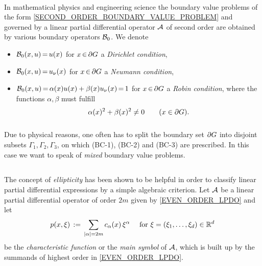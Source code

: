\documentclass[11pt,twoside]{article}
\begin{document}
\paragraph{} %
In mathematical physics and engineering science
the boundary value problems of the form \eqref{SECOND_ORDER_BOUNDARY_VALUE_PROBLEM}
and governed by a linear partial differential operator ${\mathcal{A}}$ of second order
are obtained by various boundary operators ${\mathcal{B}}_0$.
We denote

\begin{itemize}[leftmargin=15mm,itemsep=2pt]
\item[(BC-1)]
\;${\mathcal{B}}_0(x,u) {\,=\,} u(x)$ for $x {\,\in\,} \partial G$ a \textit{Dirichlet condition},

\item[(BC-2)]
\;${\mathcal{B}}_0(x,u) {\,=\,} u_{\nu}(x)$ for $x {\,\in\,} \partial G$ a \textit{Neumann condition},

\item[(BC-3)]
\;${\mathcal{B}}_0(x,u) {\,=\,} \alpha(x)u(x)+\beta(x) u_{\nu}(x) {\,=\,} 1$ for $x {\,\in\,} \partial G$ 
a \textit{Robin condition},
where the functions $\alpha, \beta$ must fulfill 
\[
\alpha(x)^2 + \beta(x)^2 \neq 0 \quad \quad (x \in \partial G).
\]
\end{itemize}

\subparagraph{} %
Due to physical reasons,
one often has to split the boundary set $\partial G$
into disjoint subsets $\Gamma_1,\Gamma_2,\Gamma_3$,
on which (BC-1), (BC-2) and (BC-3) are prescribed.
In this case we want to speak of \textit{mixed} boundary value problems.

\subsection{} %
The concept of \textit{ellipticity} has been shown to be helpful
in order to classify linear partial differential expressions
by a simple algebraic criterion.
Let ${\mathcal{A}}$ be a linear partial differential operator of order $2m$
given by \eqref{EVEN_ORDER_LPDO} and let
\[
p(x,\xi) \eqdef \sum_{\abs{\alpha} = 2m} c_{\alpha}(x) \, \xi^{\alpha}
\quad \for \xi = (\xi_1,\ldots,\xi_d) \in \Rd
\]
be the \textit{characteristic function} or the \textit{main symbol} of ${\mathcal{A}}$,
which is built up by the summands of highest order in \eqref{EVEN_ORDER_LPDO}.
\end{document}
